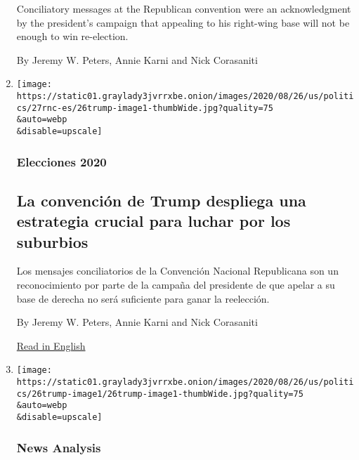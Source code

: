 \begin{enumerate}
  Conciliatory messages at the Republican convention were an
  acknowledgment by the president's campaign that appealing to his
  right-wing base will not be enough to win re-election.

  By Jeremy W. Peters, Annie Karni and Nick Corasaniti
\item
  \href{/es/2020/08/27/espanol/estados-unidos/trump-convencion-republicana.html}{}

  \texttt{[image: https://static01.graylady3jvrrxbe.onion/images/2020/08/26/us/politics/27rnc-es/26trump-image1-thumbWide.jpg?quality=75\\\&auto=webp\\\&disable=upscale]}

  \hypertarget{elecciones-2020}{%
  \subsubsection{Elecciones 2020}\label{elecciones-2020}}

  \hypertarget{la-convenciuxf3n-de-trump-despliega-una-estrategia-crucial-para-luchar-por-los-suburbios}{%
  \subsection{La convención de Trump despliega una estrategia crucial
  para luchar por los
  suburbios}\label{la-convenciuxf3n-de-trump-despliega-una-estrategia-crucial-para-luchar-por-los-suburbios}}

  Los mensajes conciliatorios de la Convención Nacional Republicana son
  un reconocimiento por parte de la campaña del presidente de que apelar
  a su base de derecha no será suficiente para ganar la reelección.

  By Jeremy W. Peters, Annie Karni and Nick Corasaniti

  \href{https://www.nytimes3xbfgragh.onion/2020/08/26/us/politics/rnc-trump-character.html}{Read
  in English}
\item
  \href{/2020/08/26/us/politics/rnc-trump-character.html}{}

  \texttt{[image: https://static01.graylady3jvrrxbe.onion/images/2020/08/26/us/politics/26trump-image1/26trump-image1-thumbWide.jpg?quality=75\\\&auto=webp\\\&disable=upscale]}

  \hypertarget{news-analysis-1}{%
  \subsubsection{News Analysis}\label{news-analysis-1}}

  \hypertarget{how-trumps-convention-has-become-a-crucial-play-for-the-suburbs-1}{%
}
\end{enumerate}
